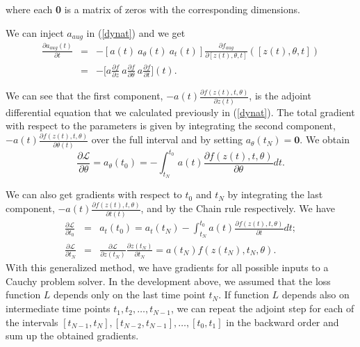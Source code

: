 \documentclass[10pt,a4paper]{article}
\theoremstyle{definition}
\theoremstyle{definition}
\theoremstyle{definition}
\begin{document}
where each \textbf{0} is a matrix of zeros with the corresponding dimensions.

We can inject $a_{aug}$ in (\ref{dynat}) and we get
\begin{eqnarray*}
\frac{\partial a_{aug}(t)}{\partial t} 
&=& - [a(t) \ a_\theta (t) \ a_t (t)]\frac{\partial f_{aug}}{\partial [ z(t),\theta , t]}([z(t),\theta , t]) \\
&=& -\Big[a\frac{\partial f}{\partial z} \ a\frac{\partial f}{\partial \theta} \ a\frac{\partial  f}{\partial t}\Big] (t).
\end{eqnarray*}


We can see that the first component, $-a(t)\frac{\partial f(z(t),t,\theta)}{\partial z(t)}$, is the adjoint differential equation that we calculated previously in (\ref{dynat}). The total gradient with respect to the parameters is given by integrating the second component, $-a(t)\frac{\partial f(z(t),t,\theta)}{\partial \theta(t)}$ over the full interval and by setting $a_\theta (t_N) = \textbf{0}$. We obtain 
\begin{equation*}
\frac{\partial \mathcal{L}}{\partial \theta} = a_\theta (t_0) = - \int_{t_N}^{t_0} a(t) \frac{\partial f(z(t),t,\theta)}{\partial \theta} dt.
\end{equation*}


We can also get gradients with respect to $t_0$ and $t_N$ by integrating the last component, $-a(t)\frac{\partial f(z(t),t,\theta)}{\partial t(t)}$, and by the Chain rule respectively. We have
\begin{eqnarray*}
\frac{\partial \mathcal{L}}{\partial t_0} &=& a_t(t_0) = a_t(t_N) - \int_{t_N}^{t_0} a(t) \frac{\partial f(z(t),t,\theta)}{\partial t} dt ; \\
\frac{\partial \mathcal{L}}{\partial t_N} &=& \frac{\partial \mathcal{L}}{\partial z(t_N)} \frac{\partial z(t_N)}{\partial t_N} = a(t_N)f(z(t_N),t_N,\theta).
\end{eqnarray*}
With this generalized method, we have gradients for all possible inputs to a Cauchy problem solver. In the development above, we assumed that the loss function $L$ depends only on the last time point $t_N$. If function $L$ depends also on intermediate time points $t_1, t_2, \dots , t_{N-1}$, we can repeat the adjoint step for each of the intervals $[t_{N-1}, t_N ],[t_{N-2}, t_{N-1}], \dots , [t_0,t_1]$ in the backward order and sum up the obtained gradients.
\end{document}
